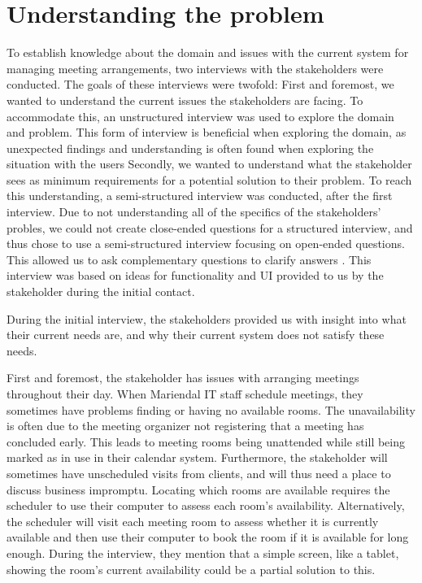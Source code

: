 \section{Understanding the problem}\label{sec:understanding_the_problem} %
To establish knowledge about the domain and issues with the current system for managing meeting arrangements, two interviews with the stakeholders were conducted. 
The goals of these interviews were twofold: 
First and foremost, we wanted to understand the current issues the stakeholders are facing. 
To accommodate this, an unstructured interview was used to explore the domain and problem\cite{benyon2013designing}. 
This form of interview is beneficial when exploring the domain, as unexpected findings and understanding is often found when exploring the situation with the users\cite{benyon2013designing} 
Secondly, we wanted to understand what the stakeholder sees as minimum requirements for a potential solution to their problem. 
To reach this understanding, a semi-structured interview was conducted, after the first interview.
Due to not understanding all of the specifics of the stakeholders' probles, we could not create close-ended questions for a structured interview, and thus chose to use a semi-structured interview focusing on open-ended questions. This allowed us to ask complementary questions to clarify answers \cite{InterviewsNHS}.
This interview was based on ideas for functionality and UI provided to us by the stakeholder during the initial contact.


During the initial interview, the stakeholders provided us with insight into what their current needs are, and why their current system does not satisfy these needs.

First and foremost, the stakeholder has issues with arranging meetings throughout their day.
When Mariendal IT staff schedule meetings, they sometimes have problems finding or having no available rooms.
The unavailability is often due to the meeting organizer not registering that a meeting has concluded early.
This leads to meeting rooms being unattended while still being marked as in use in their calendar system.
Furthermore, the stakeholder will sometimes have unscheduled visits from clients, and will thus need a place to discuss business impromptu. 
Locating which rooms are available requires the scheduler to use their computer to assess each room's availability.
Alternatively, the scheduler will visit each meeting room to assess whether it is currently available and then use their computer to book the room if it is available for long enough.
During the interview, they mention that a simple screen, like a tablet, showing the room's current availability could be a partial solution to this.

